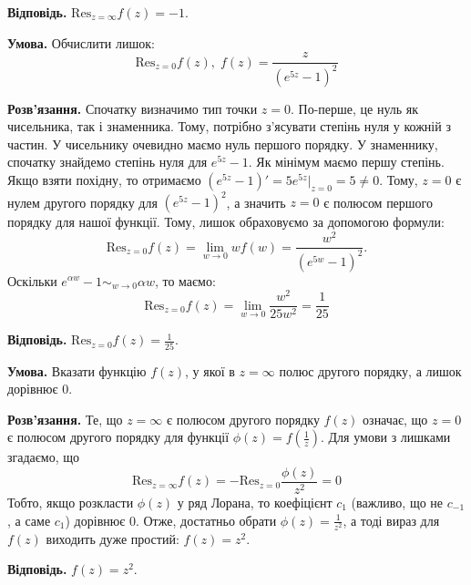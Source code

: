 \documentclass[oneside,solution]{karazin-complan-assign}
\begin{document}
\textbf{Відповідь.} $\text{Res}_{z=\infty}f(z) = -1$.

\problem{}

\hspace{20px}\textbf{Умова.} Обчислити лишок:
\begin{equation*}
    \text{Res}_{z=0}f(z), \; f(z) = \frac{z}{(e^{5z}-1)^2}
\end{equation*}

\textbf{Розв'язання.} Спочатку визначимо тип точки $z=0$. По-перше, це нуль як чисельника, так і знаменника. Тому, потрібно з'ясувати степінь нуля у кожній з частин. У чисельнику очевидно маємо нуль першого порядку. У знаменнику, спочатку знайдемо степінь нуля для $e^{5z}-1$. Як мінімум маємо першу степінь. Якщо взяти похідну, то отримаємо $(e^{5z}-1)' = 5e^{5z}\Big|_{z=0}=5 \neq 0$. Тому, $z=0$ є нулем другого порядку для $(e^{5z}-1)^2$, а значить $z=0$ є полюсом першого порядку для нашої функції. Тому, лишок обраховуємо за допомогою формули:
\begin{equation}
    \text{Res}_{z=0}f(z) = \lim_{w \to 0}wf(w) = \frac{w^2}{(e^{5w}-1)^2}.
\end{equation}
Оскільки $e^{\alpha w}-1 \sim_{w \to 0} \alpha w$, то маємо:
\begin{equation}
    \text{Res}_{z=0}f(z) = \lim_{w \to 0} \frac{w^2}{25w^2} = \boxed{\frac{1}{25}}
\end{equation}

\textbf{Відповідь.} $\text{Res}_{z=0}f(z)=\frac{1}{25}$.

\problem{}

\textbf{Умова.} Вказати функцію $f(z)$, у якої в $z=\infty$ полюс другого порядку, а лишок дорівнює $0$.

\textbf{Розв'язання.} Те, що $z=\infty$ є полюсом другого порядку $f(z)$ означає, що $z=0$ є полюсом другого порядку для функції $\phi(z)=f(\frac{1}{z})$. Для умови з лишками згадаємо, що
\begin{equation}
    \text{Res}_{z=\infty}f(z) = -\text{Res}_{z=0}\frac{\phi(z)}{z^2} = 0
\end{equation}
Тобто, якщо розкласти $\phi(z)$ у ряд Лорана, то коефіцієнт $c_{1}$ (важливо, що не $c_{-1}$, а саме $c_1$) дорівнює $0$. Отже, достатньо обрати $\phi(z)=\frac{1}{z^2}$, а тоді вираз для $f(z)$ виходить дуже простий: $f(z) = z^2$.

\textbf{Відповідь.} $f(z)=z^2$.
\end{document}
